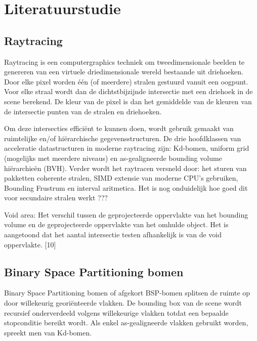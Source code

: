 \chapter{Literatuurstudie}
\label{hoofdstuk:literature}

\section{Raytracing}
Raytracing is een computergraphics techniek om tweedimensionale beelden te genereren van een virtuele driedimensionale wereld bestaande uit driehoeken.
Door elke pixel worden één (of meerdere) stralen gestuurd vanuit een oogpunt.
Voor elke straal wordt dan de dichtstbijzijnde intersectie met een driehoek in de scene berekend.
De kleur van de pixel is dan het gemiddelde van de kleuren van de intersectie punten van de stralen en driehoeken.

Om deze intersecties efficiënt te kunnen doen, wordt gebruik gemaakt van ruimtelijke en/of hiërarchische gegevensstructuren.
De drie hoofdklassen van acceleratie datastructuren in moderne raytracing zijn: Kd-bomen, uniform grid (mogelijks met meerdere niveaus) en as-gealigneerde bounding volume hiërarchieën (BVH). 
Verder wordt het raytracen versneld door: het sturen van pakketten coherente stralen, SIMD extensie van moderne CPU's gebruiken, Bounding Frustrum en interval aritmetica.
Het is nog onduidelijk hoe goed dit voor secundaire stralen werkt ???

Void area: Het verschil tussen de geprojecteerde oppervlakte van het bounding volume en de geprojecteerde oppervlakte van het omhulde object.
Het is aangetoond dat het aantal intersectie testen afhankelijk is van de void oppervlakte. [10]

\section{Binary Space Partitioning bomen}
Binary Space Partitioning bomen of afgekort BSP-bomen splitsen de ruimte op door willekeurig georiënteerde vlakken.
De bounding box van de scene wordt recursief onderverdeeld volgens willekeurige vlakken totdat een bepaalde stopconditie bereikt wordt.
Als enkel as-gealigneerde vlakken gebruikt worden, spreekt men van Kd-bomen.


